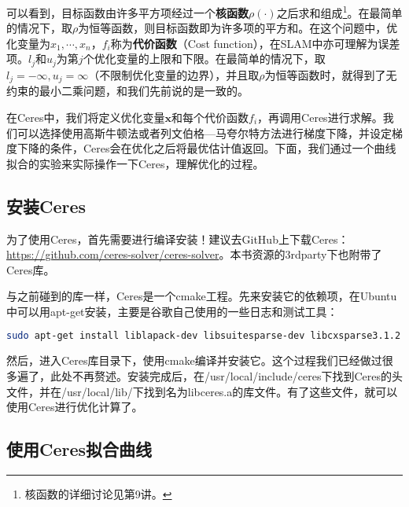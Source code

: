 可以看到，目标函数由许多平方项经过一个\textbf{核函数}$\rho(\cdot)$之后求和组成\footnote{核函数的详细讨论见第9讲。}。在最简单的情况下，取$\rho$为恒等函数，则目标函数即为许多项的平方和。在这个问题中，优化变量为$x_1, \cdots, x_n$，$f_i$称为\textbf{代价函数}（Cost function），在SLAM中亦可理解为误差项。$l_j$和$u_j$为第$j$个优化变量的上限和下限。在最简单的情况下，取$l_j = -\infty, u_j=\infty$（不限制优化变量的边界），并且取$\rho$为恒等函数时，就得到了无约束的最小二乘问题，和我们先前说的是一致的。

在Ceres中，我们将定义优化变量$\bm{x}$和每个代价函数$f_i$，再调用Ceres进行求解。我们可以选择使用高斯牛顿法或者列文伯格—马夸尔特方法进行梯度下降，并设定梯度下降的条件，Ceres会在优化之后将最优估计值返回。下面，我们通过一个曲线拟合的实验来实际操作一下Ceres，理解优化的过程。

\subsection{安装Ceres}
为了使用Ceres，首先需要进行编译安装！建议去GitHub上下载Ceres：\url{https://github.com/ceres-solver/ceres-solver}。本书资源的3rdparty下也附带了Ceres库。

与之前碰到的库一样，Ceres是一个cmake工程。先来安装它的依赖项，在Ubuntu中可以用apt-get安装，主要是谷歌自己使用的一些日志和测试工具：

\begin{lstlisting}[language=sh]
sudo apt-get install liblapack-dev libsuitesparse-dev libcxsparse3.1.2 libgflags-dev libgoogle-glog-dev libgtest-dev 
\end{lstlisting}

然后，进入Ceres库目录下，使用cmake编译并安装它。这个过程我们已经做过很多遍了，此处不再赘述。安装完成后，在/usr/local/include/ceres下找到Ceres的头文件，并在/usr/local/lib/下找到名为libceres.a的库文件。有了这些文件，就可以使用Ceres进行优化计算了。

\subsection{使用Ceres拟合曲线}

